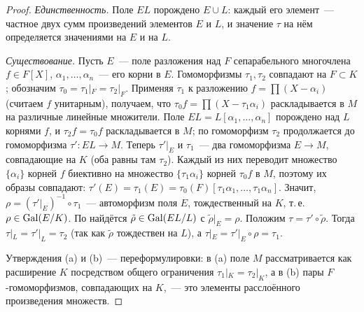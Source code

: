 \begin{proof}
\emph{Единственность.} Поле $EL$ порождено $E\cup L$: каждый его элемент~--- частное двух сумм произведений элементов $E$
и $L$, и значение $\tau$ на нём определяется значениями на $E$ и на $L$.

\emph{Существование.} Пусть $E$~--- поле разложения над $F$ сепарабельного многочлена $f\in F[X]$, $\alpha_1,\dots,\alpha_n$~---
его корни в $E$. Гомоморфизмы $\tau_1,\tau_2$ совпадают на $F\subset K$; обозначим $\tau_0=\tau_1|_F=\tau_2|_F$. Применяя $\tau_1$ к разложению $f=\prod(X-\alpha_i)$ (считаем $f$ унитарным), получаем, что
$\tau_0f=\prod(X-\tau_1\alpha_i)$ раскладывается в $M$ на различные линейные множители. Поле $EL=L[\alpha_1,\dots,\alpha_n]$
порождено над $L$ корнями $f$, и $\tau_2f=\tau_0f$ раскладывается в $M$; по  гомоморфизм $\tau_2$ продолжается до
гомоморфизма $\tau'\colon EL\to M$. Теперь $\tau'|_E$ и $\tau_1$~--- два гомоморфизма $E\to M$, совпадающие на $K$
(оба равны там $\tau_2$). Каждый из них переводит множество $\{\alpha_i\}$ корней $f$ биективно на множество
$\{\tau_1\alpha_i\}$ корней $\tau_0f$ в $M$, поэтому их образы совпадают: $\tau'(E)=\tau_1(E)=\tau_0(F)[\tau_1\alpha_1,\dots,\tau_1\alpha_n]$.
Значит, $\rho=(\tau'|_E)^{-1}\circ\tau_1$~--- автоморфизм поля $E$, тождественный на $K$, т.\,е.\ $\rho\in\operatorname{Gal}(E/K)$. По
 найдётся $\tilde\rho\in\operatorname{Gal}(EL/L)$ с $\tilde\rho|_E=\rho$. Положим $\tau=\tau'\circ\tilde\rho$. Тогда
$\tau|_L=\tau'|_L=\tau_2$ (так как $\tilde\rho$ тождествен на $L$), а $\tau|_E=\tau'|_E\circ\rho=\tau_1$.

Утверждения (a) и (b)~--- переформулировки: в (a) поле $M$ рассматривается как расширение $K$ посредством общего
ограничения $\tau_1|_K=\tau_2|_K$, а в (b) пары $F$-гомоморфизмов, совпадающих на $K$,~--- это элементы расслоённого
произведения множеств.
\end{proof}

\begin{keepfig}
\begin{center}
\end{center}
\end{keepfig}

